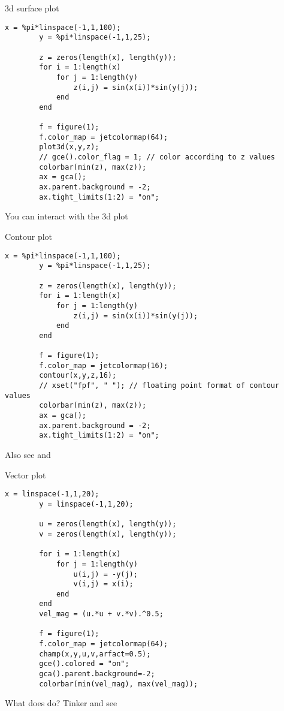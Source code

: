 \begin{frame}[fragile]{3d surface plot}
    \begin{lstlisting}[basicstyle=\scriptsize\ttfamily\linespread{1.2}]
        x = %pi*linspace(-1,1,100);
        y = %pi*linspace(-1,1,25);
        
        z = zeros(length(x), length(y));
        for i = 1:length(x)
            for j = 1:length(y)
                z(i,j) = sin(x(i))*sin(y(j));
            end
        end
        
        f = figure(1);
        f.color_map = jetcolormap(64);
        plot3d(x,y,z);
        // gce().color_flag = 1; // color according to z values
        colorbar(min(z), max(z));
        ax = gca();
        ax.parent.background = -2;
        ax.tight_limits(1:2) = "on";
    \end{lstlisting}
    You can interact with the 3d plot
\end{frame}

\begin{frame}[fragile]{Contour plot}
    \begin{lstlisting}[basicstyle=\scriptsize\ttfamily\linespread{1.2}]
        x = %pi*linspace(-1,1,100);
        y = %pi*linspace(-1,1,25);
        
        z = zeros(length(x), length(y));
        for i = 1:length(x)
            for j = 1:length(y)
                z(i,j) = sin(x(i))*sin(y(j));
            end
        end
        
        f = figure(1);
        f.color_map = jetcolormap(16);
        contour(x,y,z,16);
        // xset("fpf", " "); // floating point format of contour values
        colorbar(min(z), max(z));
        ax = gca();
        ax.parent.background = -2;
        ax.tight_limits(1:2) = "on";
    \end{lstlisting}
    Also see  and 
\end{frame}

\begin{frame}[fragile]{Vector plot}
    \begin{lstlisting}[basicstyle=\scriptsize\ttfamily\linespread{1.2}]
        x = linspace(-1,1,20);
        y = linspace(-1,1,20);
        
        u = zeros(length(x), length(y));
        v = zeros(length(x), length(y));
        
        for i = 1:length(x)
            for j = 1:length(y)
                u(i,j) = -y(j);
                v(i,j) = x(i);
            end
        end
        vel_mag = (u.*u + v.*v).^0.5;
        
        f = figure(1);
        f.color_map = jetcolormap(64);
        champ(x,y,u,v,arfact=0.5);
        gce().colored = "on";
        gca().parent.background=-2;
        colorbar(min(vel_mag), max(vel_mag));
    \end{lstlisting}
    What does  do? Tinker and see
\end{frame}

